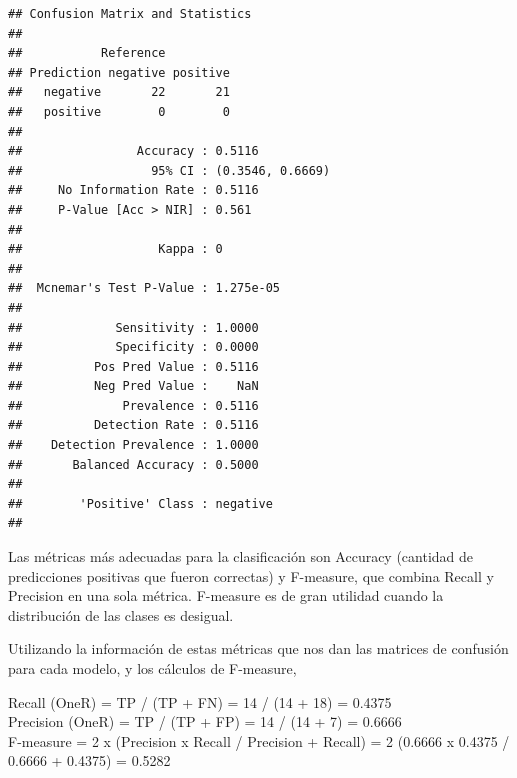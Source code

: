 \documentclass[]{article}
\newenvironment{Shaded}{\begin{snugshade}}{\end{snugshade}}
\newcommand{\DataTypeTok}[1]{\textcolor[rgb]{0.13,0.29,0.53}{#1}}
\newcommand{\KeywordTok}[1]{\textcolor[rgb]{0.13,0.29,0.53}{\textbf{#1}}}
\newcommand{\NormalTok}[1]{#1}
\newcommand{\OperatorTok}[1]{\textcolor[rgb]{0.81,0.36,0.00}{\textbf{#1}}}
\newcommand{\StringTok}[1]{\textcolor[rgb]{0.31,0.60,0.02}{#1}}
\begin{document}
\begin{Shaded}
\end{Shaded}

\begin{verbatim}
## Confusion Matrix and Statistics
## 
##           Reference
## Prediction negative positive
##   negative       22       21
##   positive        0        0
##                                           
##                Accuracy : 0.5116          
##                  95% CI : (0.3546, 0.6669)
##     No Information Rate : 0.5116          
##     P-Value [Acc > NIR] : 0.561           
##                                           
##                   Kappa : 0               
##                                           
##  Mcnemar's Test P-Value : 1.275e-05       
##                                           
##             Sensitivity : 1.0000          
##             Specificity : 0.0000          
##          Pos Pred Value : 0.5116          
##          Neg Pred Value :    NaN          
##              Prevalence : 0.5116          
##          Detection Rate : 0.5116          
##    Detection Prevalence : 1.0000          
##       Balanced Accuracy : 0.5000          
##                                           
##        'Positive' Class : negative        
## 
\end{verbatim}

Las métricas más adecuadas para la clasificación son Accuracy (cantidad de predicciones positivas que fueron correctas) y F-measure, que combina Recall y Precision en una sola métrica. F-measure es de gran utilidad cuando la distribución de las clases es desigual.

\newpage

Utilizando la información de estas métricas que nos dan las matrices de confusión para cada modelo, y los cálculos de F-measure, 

Recall (OneR) = TP / (TP + FN) = 14 / (14 + 18) = 0.4375 \\
Precision (OneR) = TP / (TP + FP) = 14 / (14 + 7) = 0.6666 \\
F-measure = 2 x (Precision x Recall / Precision + Recall) = 2 (0.6666 x 0.4375 / 0.6666 + 0.4375) = 0.5282 \\
\end{document}
